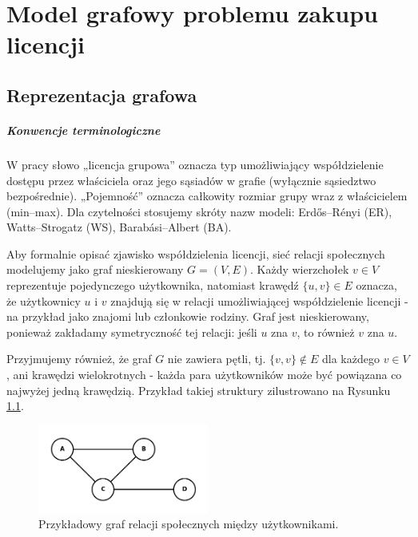 \chapter{Model grafowy problemu zakupu licencji}

\section{Reprezentacja grafowa}

\paragraph{Konwencje terminologiczne} W pracy słowo „licencja grupowa” oznacza typ umożliwiający współdzielenie dostępu przez właściciela oraz jego sąsiadów w grafie (wyłącznie sąsiedztwo bezpośrednie). „Pojemność” oznacza całkowity rozmiar grupy wraz z właścicielem (min–max). Dla czytelności stosujemy skróty nazw modeli: Erdős–Rényi (ER), Watts–Strogatz (WS), Barabási–Albert (BA).

Aby formalnie opisać zjawisko współdzielenia licencji, sieć relacji społecznych modelujemy jako graf nieskierowany \( G = (V, E) \). Każdy wierzchołek \( v \in V \) reprezentuje pojedynczego użytkownika, natomiast krawędź \( \{u, v\} \in E \) oznacza, że użytkownicy \( u \) i \( v \) znajdują się w relacji umożliwiającej współdzielenie licencji - na przykład jako znajomi lub członkowie rodziny. Graf jest nieskierowany, ponieważ zakładamy symetryczność tej relacji: jeśli \( u \) zna \( v \), to również \( v \) zna \( u \).

Przyjmujemy również, że graf \( G \) nie zawiera pętli, tj. \( \{v, v\} \notin E \) dla każdego \( v \in V \), ani krawędzi wielokrotnych - każda para użytkowników może być powiązana co najwyżej jedną krawędzią. Przykład takiej struktury zilustrowano na Rysunku \ref{fig:social_graph}.

\begin{figure}[H]
    \centering
    \includegraphics[width=0.5\textwidth]{assets/graphmodelexample.png}
    \caption{Przykładowy graf relacji społecznych między użytkownikami.}
    \label{fig:social_graph}
\end{figure}

